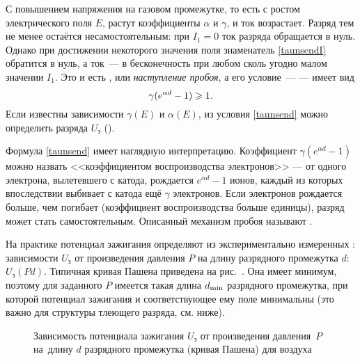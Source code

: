 \begin{labsupplement}
С повышением напряжения на газовом промежутке, то есть с ростом электрического
поля $E$, растут коэффициенты $\alpha$ и $\gamma$, и ток возрастает.
Разряд тем не менее остаётся несамостоятельным: при $I_1=0$ ток разряда
обращается в нуль. Однако при достижении некоторого значения поля
знаменатель \eqref{taunsendI} обратится в нуль,
а ток~--- в бесконечность при любом сколь угодно малом значении $I_1$.
Это и есть , или \emph{наступление пробоя}, а его
условие~---  --- имеет вид
\begin{equation}
    \eqmark{taunsend}
	\gamma(e^{\alpha d}-1)\ge 1.
\end{equation}
Если известны зависимости $\gamma(E)$ и $\alpha(E)$, из условия \eqref{taunsend}
можно определить  разряда $U_{з}$
().

Формула \eqref{taunsend} имеет наглядную интерпретацию. 
Коэффициент $\gamma (e^{\alpha d}-1)$ можно назвать
<<коэффициентом воспроизводства электронов>> --- от одного электрона,
вылетевшего с катода, рождается $e^{\alpha d}-1$ ионов,
каждый из которых впоследствии выбивает с катода ещё $\gamma$ электронов.
Если электронов рождается больше, чем погибает (коэффициент воспроизводства больше единицы), 
разряд может стать самостоятельным.
Описанный механизм пробоя называют . 

На практике потенциал зажигания определяют из экспериментально измеренных
: зависимости $U_{з}$ от произведения
давления $P$ на длину разрядного промежутка $d$: $U_{з}(Pd)$.
Типичная кривая Пашена приведена на рис.~.
Она имеет минимум, поэтому для заданного $P$ имеется такая длина
$d_{\rm min}$ разрядного промежутка,
при которой потенциал зажигания и соответствующее ему поле минимальны
(это важно для структуры тлеющего разряда, см. ниже).

\begin{figure}[h!]
	\centering
\footnotesize	{}
	\caption{Зависимость потенциала зажигания $U_\text{з}$ от произведения
давления~$P$ на~длину $d$ разрядного промежутка (кривая Пашена) для воздуха}
\end{figure}




\end{labsupplement}
